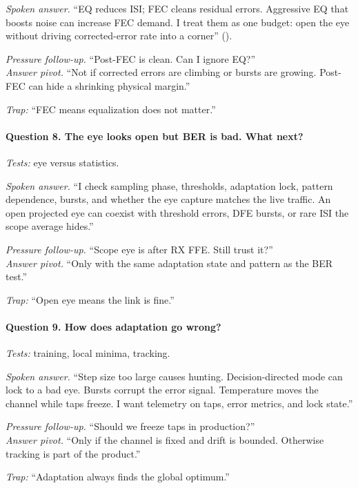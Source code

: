 \textit{Spoken answer.}
``EQ reduces ISI; FEC cleans residual errors. Aggressive EQ that boosts noise
can increase FEC demand. I treat them as one budget: open the eye without
driving corrected-error rate into a corner'' ().

\textit{Pressure follow-up.} ``Post-FEC is clean. Can I ignore EQ?''\\
\textit{Answer pivot.} ``Not if corrected errors are climbing or bursts are
growing. Post-FEC can hide a shrinking physical margin.''

\textit{Trap:} ``FEC means equalization does not matter.''

\paragraph{Question 8. The eye looks open but BER is bad. What next?}
\textit{Tests:} eye versus statistics.

\textit{Spoken answer.}
``I check sampling phase, thresholds, adaptation lock, pattern dependence,
bursts, and whether the eye capture matches the live traffic. An open projected
eye can coexist with threshold errors, DFE bursts, or rare ISI the scope average
hides.''

\textit{Pressure follow-up.} ``Scope eye is after RX FFE. Still trust it?''\\
\textit{Answer pivot.} ``Only with the same adaptation state and pattern as the
BER test.''

\textit{Trap:} ``Open eye means the link is fine.''

\paragraph{Question 9. How does adaptation go wrong?}
\textit{Tests:} training, local minima, tracking.

\textit{Spoken answer.}
``Step size too large causes hunting. Decision-directed mode can lock to a bad
eye. Bursts corrupt the error signal. Temperature moves the channel while taps
freeze. I want telemetry on taps, error metrics, and lock state.''

\textit{Pressure follow-up.} ``Should we freeze taps in production?''\\
\textit{Answer pivot.} ``Only if the channel is fixed and drift is bounded.
Otherwise tracking is part of the product.''

\textit{Trap:} ``Adaptation always finds the global optimum.''

